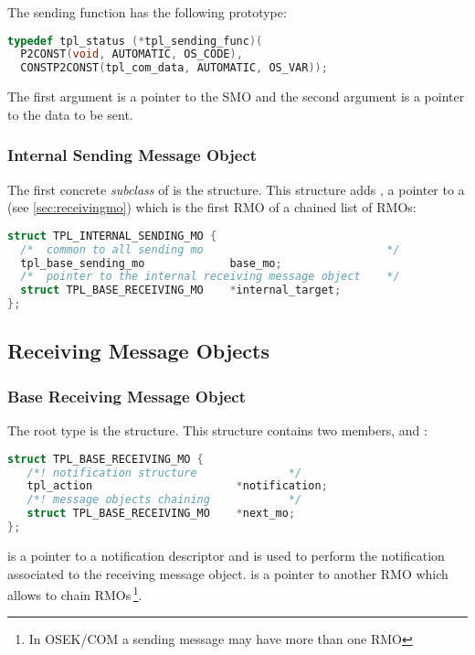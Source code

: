 The sending function has the following prototype:

\begin{lstlisting}[language=C]
typedef tpl_status (*tpl_sending_func)(
  P2CONST(void, AUTOMATIC, OS_CODE),
  CONSTP2CONST(tpl_com_data, AUTOMATIC, OS_VAR));
\end{lstlisting}

The first argument is a pointer to the SMO and the second argument is a pointer to the data to be sent.

\subsubsection{Internal Sending Message Object}

The first concrete {\em subclass} of  is the  structure. This structure adds , a pointer to a  (see \ref{sec:receivingmo}) which is the first RMO of a chained list of RMOs:

\begin{lstlisting}[language=C]
struct TPL_INTERNAL_SENDING_MO {
  /*  common to all sending mo                            */
  tpl_base_sending_mo             base_mo;
  /*  pointer to the internal receiving message object    */
  struct TPL_BASE_RECEIVING_MO    *internal_target;
};
\end{lstlisting}

\subsection{Receiving Message Objects}

\subsubsection{Base Receiving Message Object}

The root type is the  structure. This structure contains two members,  and :

\begin{lstlisting}[language=C]
struct TPL_BASE_RECEIVING_MO {
   /*! notification structure              */
   tpl_action                      *notification;
   /*! message objects chaining            */
   struct TPL_BASE_RECEIVING_MO    *next_mo;
};
\end{lstlisting}

 is a pointer to a notification descriptor and is used to perform the notification associated to the receiving message object.  is a pointer to another RMO which allows to chain RMOs\,\footnote{In OSEK/COM a sending message may have more than one RMO}.

